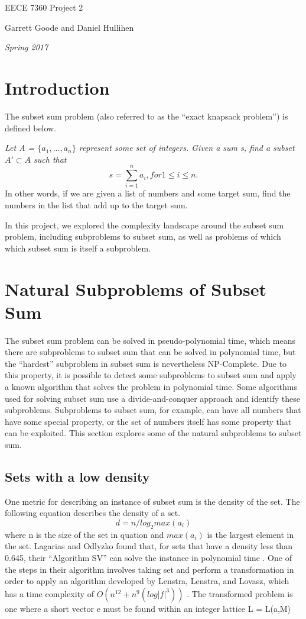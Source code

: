 \documentclass{article}
\begin{document}
\centerline{\sc \large EECE 7360 Project 2}
\vspace{.5pc}
\centerline{\sc Garrett Goode and Daniel Hullihen}
\centerline{\it Spring 2017}

\section{Introduction}
The subset sum problem (also referred to as the ``exact knapsack problem'')
is defined below.

\textit{Let A = $\{a_1, ..., a_n\}$ represent some set of integers. Given a sum s, find a subset $A' \subset A$ such that
  $$s = \sum_{i=1}^n a_i, for 1 \le i \le n.$$}
In other words, if we are given a list of numbers and some target sum, find the numbers in the list that
add up to the target sum. 

In this project, we explored the complexity landscape around the subset sum
problem, including subproblems to subset sum, as well as problems of which
which subset sum is itself a subproblem.

\section{Natural Subproblems of Subset Sum}
The subset sum problem can be solved in pseudo-polynomial time, which means
there are subproblems to subset sum that can be solved in polynomial time,
but the ``hardest'' subproblem in subset sum is nevertheless NP-Complete. Due
to this property, it is possible to detect some subproblems to subset
sum and apply a known algorithm that solves the problem in polynomial time.
Some algorithms used for solving subset sum use a divide-and-conquer
approach and identify these subproblems. Subproblems
to subset sum, for example, can have all numbers that have some special
property, or the set of numbers itself has some property that can be
exploited.
This section explores some of the natural subproblems to subset sum. 

\subsection{Sets with a low density}
One metric for describing an instance of subset sum is
the density of the set. The following equation
describes the density of a set.
$$d = n / log_2 max(a_i)$$
where n is the size of the set in quation and $max(a_i)$ is the largest
element in the set.
Lagarias and Odlyzko found that, for sets that have a density less than 0.645,
their ``Algorithm SV'' can solve the instance in polynomial
time \cite{lagarias1985}. One of the steps in their algorithm involves
taking set and perform a transformation in order to apply an
algorithm developed by Lenstra, Lenstra, and Lovasz, which has a time
complexity of $O(n^{12}+n^9(log|f|^3))$ \cite{lenstra1982}. The transformed
problem is one where a short vector e must be found within an integer lattice
L = L(a,M)
\end{document}

